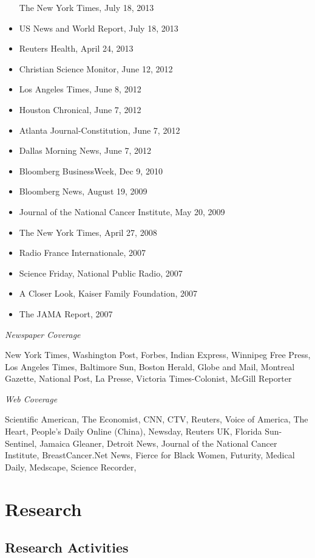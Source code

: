 \documentclass[
  letterpaper,
  DIV=11,
  numbers=noendperiod]{scrartcl}
\begin{document}
\begin{itemize}
  The New York Times, July 18, 2013
\item
  US News and World Report, July 18, 2013
\item
  Reuters Health, April 24, 2013
\item
  Christian Science Monitor, June 12, 2012
\item
  Los Angeles Times, June 8, 2012
\item
  Houston Chronical, June 7, 2012
\item
  Atlanta Journal-Constitution, June 7, 2012
\item
  Dallas Morning News, June 7, 2012
\item
  Bloomberg BusinessWeek, Dec 9, 2010
\item
  Bloomberg News, August 19, 2009
\item
  Journal of the National Cancer Institute, May 20, 2009
\item
  The New York Times, April 27, 2008
\item
  Radio France Internationale, 2007
\item
  Science Friday, National Public Radio, 2007
\item
  A Closer Look, Kaiser Family Foundation, 2007
\item
  The JAMA Report, 2007
\end{itemize}

\emph{Newspaper Coverage}

New York Times, Washington Post, Forbes, Indian Express, Winnipeg Free
Press, Los Angeles Times, Baltimore Sun, Boston Herald, Globe and Mail,
Montreal Gazette, National Post, La Presse, Victoria Times-Colonist,
McGill Reporter

\emph{Web Coverage}

Scientific American, The Economist, CNN, CTV, Reuters, Voice of America,
The Heart, People's Daily Online (China), Newsday, Reuters UK, Florida
Sun-Sentinel, Jamaica Gleaner, Detroit News, Journal of the National
Cancer Institute, BreastCancer.Net News, Fierce for Black Women,
Futurity, Medical Daily, Medscape, Science Recorder,

\hypertarget{research}{%
\section{Research}\label{research}}

\hypertarget{research-activities}{%
\subsection{Research Activities}\label{research-activities}}
\end{document}
